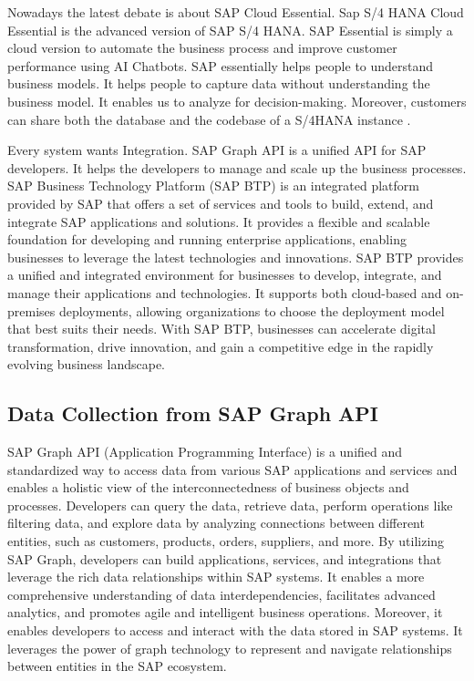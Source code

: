 \documentclass{article}
\begin{document}
Nowadays the latest debate is about SAP Cloud Essential. Sap S/4 HANA Cloud Essential is the advanced version of SAP S/4 HANA. SAP Essential is simply a cloud version to automate the business process and improve customer performance using AI Chatbots. SAP essentially helps people to understand business models. It helps people to capture data without understanding the business model. It enables us to analyze for decision-making. Moreover, customers can share both the database and the codebase of a S/4HANA instance \parencite{singh2023life}. 

Every system wants Integration. SAP Graph API is a unified API for SAP developers. It helps the developers to manage and scale up the business processes. SAP Business Technology Platform (SAP BTP) is an integrated platform provided by SAP that offers a set of services and tools to build, extend, and integrate SAP applications and solutions. It provides a flexible and scalable foundation for developing and running enterprise applications, enabling businesses to leverage the latest technologies and innovations. SAP BTP provides a unified and integrated environment for businesses to develop, integrate, and manage their applications and technologies. It supports both cloud-based and on-premises deployments, allowing organizations to choose the deployment model that best suits their needs. With SAP BTP, businesses can accelerate digital transformation, drive innovation, and gain a competitive edge in the rapidly evolving business landscape. \parencite{cox2020saps}

\maketitle
\subsection{Data Collection from SAP Graph API}
SAP Graph API (Application Programming Interface) is a unified and standardized way to access data from various SAP applications and services and enables a holistic view of the interconnectedness of business objects and processes. Developers can query the data, retrieve data, perform operations like filtering data, and explore data by analyzing connections between different entities, such as customers, products, orders, suppliers, and more. By utilizing SAP Graph, developers can build applications, services, and integrations that leverage the rich data relationships within SAP systems. It enables a more comprehensive understanding of data interdependencies, facilitates advanced analytics, and promotes agile and intelligent business operations. Moreover, it enables developers to access and interact with the data stored in SAP systems. It leverages the power of graph technology to represent and navigate relationships between entities in the SAP ecosystem.
\end{document}
